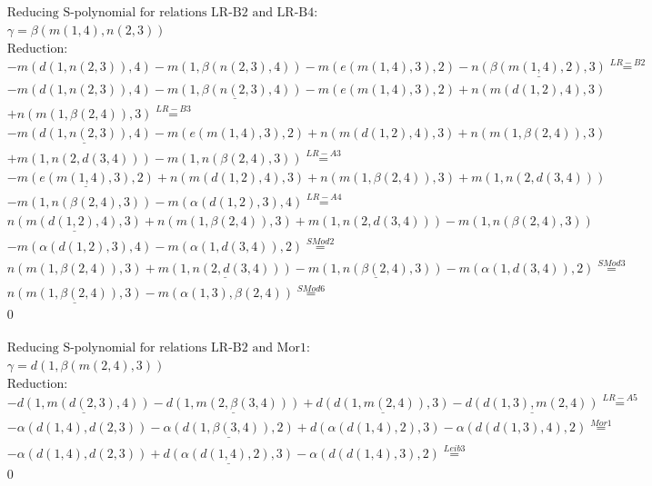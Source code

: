 \documentclass[11pt]{amsart}
\begin{document}
\begin{align*} 
& \text{Reducing S-polynomial for relations LR-B2 and LR-B4:} \\ 
& \gamma = \beta(m(1,4),n(2,3)) \\ 
& \text{Reduction}: \\& - m(d(1,n(2,3)),4) - m(1,\beta(n(2,3),4)) - m(e(m(1,4),3),2) - \underline{n(\beta(m(1,4),2),3)} \stackrel{ LR-B2 }{=}  \\ 
& - m(d(1,n(2,3)),4) - \underline{m(1,\beta(n(2,3),4))} - m(e(m(1,4),3),2) + n(m(d(1,2),4),3)\\ 
 &  + n(m(1,\beta(2,4)),3) \stackrel{ LR-B3 }{=}  \\ 
& - \underline{m(d(1,n(2,3)),4)} - m(e(m(1,4),3),2) + n(m(d(1,2),4),3) + n(m(1,\beta(2,4)),3)\\ 
 &  + m(1,n(2,d(3,4))) - m(1,n(\beta(2,4),3)) \stackrel{ LR-A3 }{=}  \\ 
& - \underline{m(e(m(1,4),3),2)} + n(m(d(1,2),4),3) + n(m(1,\beta(2,4)),3) + m(1,n(2,d(3,4)))\\ 
 &  - m(1,n(\beta(2,4),3)) - m(\alpha(d(1,2),3),4) \stackrel{ LR-A4 }{=}  \\ 
&\underline{n(m(d(1,2),4),3)} + n(m(1,\beta(2,4)),3) + m(1,n(2,d(3,4))) - m(1,n(\beta(2,4),3))\\ 
 &  - m(\alpha(d(1,2),3),4) - m(\alpha(1,d(3,4)),2) \stackrel{ SMod2 }{=}  \\ 
&n(m(1,\beta(2,4)),3) + \underline{m(1,n(2,d(3,4)))} - \underline{m(1,n(\beta(2,4),3))} - m(\alpha(1,d(3,4)),2) \stackrel{ SMod3 }{=}  \\ 
&\underline{n(m(1,\beta(2,4)),3)} - m(\alpha(1,3),\beta(2,4)) \stackrel{ SMod6 }{=}  \\ 
&0\\ 
\end{align*} 
 
\begin{align*} 
& \text{Reducing S-polynomial for relations LR-B2 and Mor1:} \\ 
& \gamma = d(1,\beta(m(2,4),3)) \\ 
& \text{Reduction}: \\& - \underline{d(1,m(d(2,3),4))} - \underline{d(1,m(2,\beta(3,4)))} + \underline{d(d(1,m(2,4)),3)} - \underline{d(d(1,3),m(2,4))} \stackrel{ LR-A5 }{=}  \\ 
& - \alpha(d(1,4),d(2,3)) - \underline{\alpha(d(1,\beta(3,4)),2)} + d(\alpha(d(1,4),2),3) - \alpha(d(d(1,3),4),2) \stackrel{ Mor1 }{=}  \\ 
& - \alpha(d(1,4),d(2,3)) + \underline{d(\alpha(d(1,4),2),3)} - \alpha(d(d(1,4),3),2) \stackrel{ Leib3 }{=}  \\ 
&0\\ 
\end{align*} 
 
\end{document}
